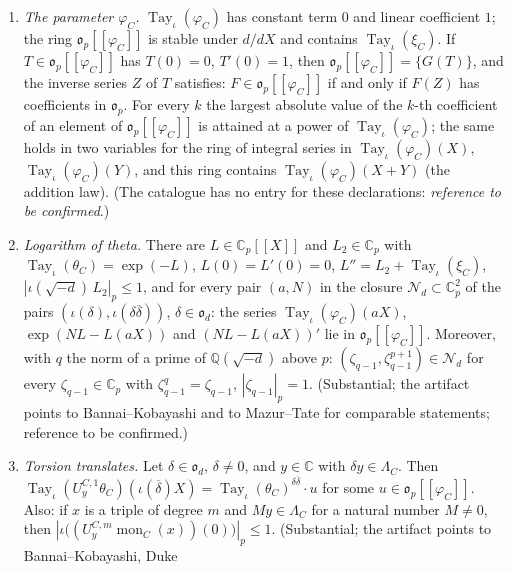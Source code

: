 \documentclass[11pt,a4paper]{article}
\newcommand{\Q}{\mathbb{Q}}
\theoremstyle{plainx}
\theoremstyle{uprightx}
\newcommand{\CC}{\mathbb{C}}
\newcommand{\Cp}{\CC_p}
\newcommand{\op}{\mathfrak{o}_p}
\newcommand{\np}[1]{|#1|_p}
\newcommand{\cj}[1]{\overline{#1}}
\newcommand{\OO}{\mathfrak{o}}
\newcommand{\LamC}[1]{\Lambda_{#1}}
\newcommand{\thC}[1]{\theta_{#1}}
\newcommand{\xiC}[1]{\xi_{#1}}
\newcommand{\phC}[1]{\varphi_{#1}}
\newcommand{\UC}[3]{U^{#1,#2}_{#3}}
\newcommand{\tayj}[1]{\operatorname{Tay}_\iota(#1)}
\newcommand{\phiring}[1]{\op[[\phC{#1}]]}
\newcommand{\mon}[2]{\operatorname{mon}_{#1}(#2)}
\begin{document}
\begin{enumerate}[label=\textup{(Q\arabic*)},leftmargin=3.1em,itemsep=2pt]
coefficient follows from the integrality of the modular invariant of a curve with complex multiplication and the
equation of the normalised cubic (D.~Cox, \emph{Primes of the Form $x^2+ny^2$}, Thm.~11.1; J.~Silverman,
\emph{Advanced Topics in the Arithmetic of Elliptic Curves}, II, Thm.~6.1). Also quoted:
a complex number $x$ with $|\iota(x)|_2\le c$, for one real number $c$ and every field isomorphism $\iota$ from
$\CC$ onto an algebraic closure of $\Q_2$ (whose absolute value is $|\cdot|_2$), is algebraic over~$\Q$.
\item \emph{The parameter $\phC{C}$.} $\tayj{\phC{C}}$ has constant term $0$ and linear coefficient $1$; the ring
$\phiring{C}$ is stable under $d/dX$ and contains $\tayj{\xiC{C}}$. If $T\in\phiring{C}$ has $T(0)=0$, $T'(0)=1$,
then $\phiring{C}=\{G(T)\}$, and the inverse series $Z$ of $T$ satisfies: $F\in\phiring{C}$ if and only if $F(Z)$
has coefficients in $\op$. For every $k$ the largest absolute value of the $k$-th coefficient of an element of
$\phiring{C}$ is attained at a power of $\tayj{\phC{C}}$; the same holds in two variables for the ring of integral
series in $\tayj{\phC{C}}(X)$, $\tayj{\phC{C}}(Y)$, and this ring contains $\tayj{\phC{C}}(X+Y)$ (the addition law).
(The catalogue has no entry for these declarations: \emph{reference to be confirmed}.)
\item \emph{Logarithm of theta.} There are $L\in\Cp[[X]]$ and $L_2\in\Cp$ with $\tayj{\thC{C}}=\exp(-L)$,
$L(0)=L'(0)=0$, $L''=L_2+\tayj{\xiC{C}}$, $\np{\iota(\sqrt{-d})\,L_2}\le1$, and for every pair $(a,N)$ in the closure
$\mathcal{N}_d\subset\Cp^2$ of the pairs $(\iota(\delta),\iota(\delta\cj{\delta}))$, $\delta\in\OO_d$: the series
$\tayj{\phC{C}}(aX)$, $\exp(NL-L(aX))$ and $(NL-L(aX))'$ lie in $\phiring{C}$. Moreover, with $q$ the norm of a
prime of $\Q(\sqrt{-d})$ above $p$: $(\zeta_{q-1},\zeta_{q-1}^{p+1})\in\mathcal{N}_d$ for every $\zeta_{q-1}\in\Cp$ with $\zeta_{q-1}^{q}=\zeta_{q-1}$,
$\np{\zeta_{q-1}}=1$. (Substantial; the artifact points to Bannai--Kobayashi and to Mazur--Tate for comparable
statements; reference to be confirmed.)
\item \emph{Torsion translates.} Let $\delta\in\OO_d$, $\delta\ne0$, and $y\in\CC$ with $\delta y\in\LamC{C}$. Then
$\tayj{\UC{C}{1}{y}\thC{C}}(\iota(\cj\delta)X)=\tayj{\thC{C}}^{\delta\cj\delta}\cdot u$ for some $u\in\phiring{C}$. Also:
if $x$ is a triple of degree $m$ and $My\in\LamC{C}$ for a natural number $M\ne0$, then
$\np{\iota\bigl((\UC{C}{m}{y}\mon{C}{x})(0)\bigr)}\le1$. (Substantial; the artifact points to Bannai--Kobayashi, Duke

\end{enumerate}
\end{document}
